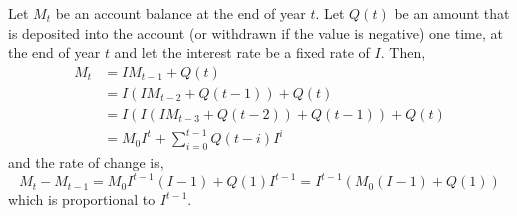 \documentclass[../MathsNotesBase.tex]{subfiles}
\begin{document}
{\begin{exe}
			\biggerskip
			\item{Let $M_t$ be an account balance at the end of year $t$. Let $Q(t)$ be an amount that is deposited into the account (or withdrawn if the value is negative) one time, at the end of year $t$ and let the interest rate be a fixed rate of $I$. Then,
				\begin{align*}
					M_t &= I M_{t-1} + Q(t) \\
					&= I (I M_{t-2} + Q(t-1)) + Q(t) \\
					&= I (I (I M_{t-3} + Q(t-2)) + Q(t-1)) + Q(t) \\
					&= M_0 I^t + \sum_{i=0}^{t-1} Q(t-i) I^i
				\end{align*}
				and the rate of change is,
				\[ M_t - M_{t-1} = M_0 I^{t-1} (I - 1) + Q(1) I^{t-1} = I^{t-1} (M_0(I - 1) + Q(1)) \]
				which is proportional to $I^{t-1}$.\\
				
			}
		\end{exe}
	
	}


	
\end{document}
